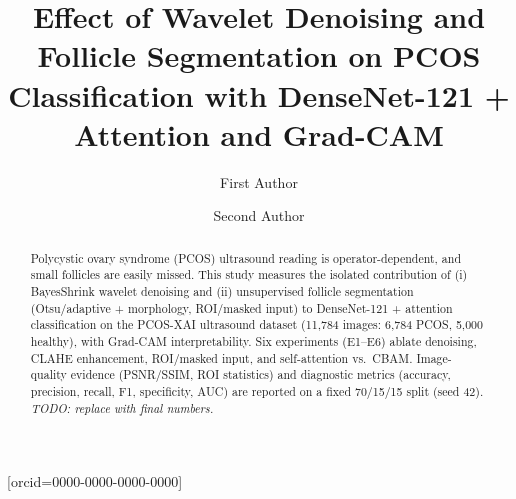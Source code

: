 \documentclass[a4paper,fleqn]{cas-sc}
\begin{document}
\let\WriteBookmarks\relax
\def\floatpagepagefraction{1}
\def\textpagefraction{.001}


\title[mode = title]{Effect of Wavelet Denoising and Follicle Segmentation on PCOS Classification with DenseNet-121 + Attention and Grad-CAM}

\tnotemark[1]

\author[1]{First Author}[orcid=0000-0000-0000-0000]
\cormark[1]

\author[1]{Second Author}



\begin{abstract}
Polycystic ovary syndrome (PCOS) ultrasound reading is operator-dependent, and small follicles are easily missed. This study measures the isolated contribution of (i) BayesShrink wavelet denoising and (ii) unsupervised follicle segmentation (Otsu/adaptive + morphology, ROI/masked input) to DenseNet-121 + attention classification on the PCOS-XAI ultrasound dataset (11,784 images: 6,784 PCOS, 5,000 healthy), with Grad-CAM interpretability. Six experiments (E1--E6) ablate denoising, CLAHE enhancement, ROI/masked input, and self-attention vs.\ CBAM. Image-quality evidence (PSNR/SSIM, ROI statistics) and diagnostic metrics (accuracy, precision, recall, F1, specificity, AUC) are reported on a fixed 70/15/15 split (seed 42). \emph{TODO: replace with final numbers.}
\end{abstract}

\begin{graphicalabstract}
\end{graphicalabstract}
\end{document}

